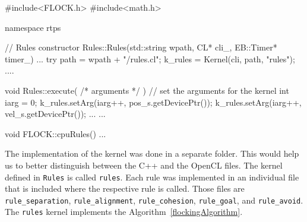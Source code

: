 \begin{cppcode}{0}
#include<FLOCK.h>
#include<math.h>

namespace rtps
{
	// Rules constructor
	Rules::Rules(std::string wpath, CL* cli_, EB::Timer* timer_)
	{
		...
		try
		{
			path = wpath + "/rules.cl";
			k_rules = Kernel(cli, path, "rules");
		}
		....
	}

	void Rules::execute( /* arguments */ )
	{
		// set the arguments for the kernel
		int iarg = 0;
		k_rules.setArg(iarg++, pos_s.getDevicePtr());
		k_rules.setArg(iarg++, vel_s.getDevicePtr());
		...
	}
	...
	
	void FLOCK::cpuRules()
	{
		...
	}
}
\end{cppcode}

The implementation of the kernel was done in a separate folder. This would help us to better distinguish between the C++ and the OpenCL files. The kernel defined in \texttt{Rules} is called \texttt{rules}. Each rule was implemented in an individual file that is included where the respective rule is called. Those files are \texttt{rule\_separation}, \texttt{rule\_alignment}, \texttt{rule\_cohesion}, \texttt{rule\_goal}, and \texttt{rule\_avoid}. The \texttt{rules} kernel implements the Algorithm~\ref{flockingAlgorithm}.





